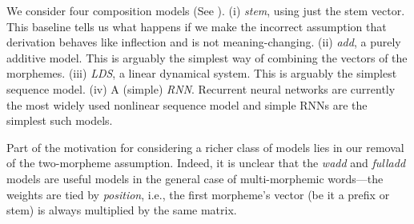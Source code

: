 \documentclass[11pt,letterpaper]{article}
\begin{document}
%
%
%

We consider four composition models
(See ). (i) \emph{stem}, using
just the stem vector. This baseline tells us what happens if
we make the incorrect assumption that derivation behaves
like inflection and is not meaning-changing.
(ii) \emph{add}, a purely additive
model. This is arguably the simplest way of combining 
the vectors of the morphemes.
 (iii) \emph{LDS}, a linear
dynamical system. This is arguably the simplest sequence
model.
(iv) A (simple) \emph{RNN}.  Recurrent neural networks
are currently the most widely used
nonlinear
sequence model and simple RNNs are the simplest such models.

Part of the motivation for considering a
richer class of models lies in our removal of the two-morpheme
assumption. Indeed, it is unclear that the {\em wadd} and {\em fulladd} models \cite{mitchell2008vector}
are useful models in the general case of multi-morphemic words---the weights
are tied by {\em position}, i.e., the first
morpheme's vector (be it a prefix or stem)
is always multiplied by the same matrix.

\def\goldmorphspace{0.1cm}
\end{document}
